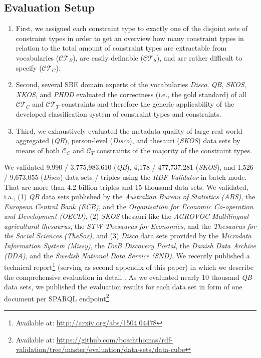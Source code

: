 \documentclass{llncs}
\begin{document}
{\subsection{Evaluation Setup}

\begin{enumerate}
	\item First, we assigned each constraint type to exactly one of the disjoint sets of constraint types 
in order to get an overview how many constraint types in relation to the total amount of constraint types are extractable from vocabularies ($\mathcal{CT}_{B}$), are easily definable ($\mathcal{CT}_{S}$), and are rather difficult to specify ($\mathcal{CT}_{C}$). 
  \item Second, several SBE domain experts of the vocabularies \emph{Disco}, \emph{QB}, \emph{SKOS}, \emph{XKOS}, and \emph{PHDD} evaluated the correctness (i.e., the gold standard) of all $\mathcal{CT}_{C}$ and $\mathcal{CT}_{T}$ constraints and therefore the generic applicability of the developed classification system of constraint types and constraints. 
  \item Third, we exhaustively evaluated the metadata quality of large real world aggregated (\emph{QB}), person-level (\emph{Disco}), and thesauri (\emph{SKOS}) data sets by means of both $\mathcal{C}_{C}$ and $\mathcal{C}_{T}$ constraints of the majority of the constraint types.
\end{enumerate}
We validated 
9,990 / 3,775,983,610 (\emph{QB}),
4,178 / 477,737,281 (\emph{SKOS}), and 
1,526 / 9,673,055 (\emph{Disco}) data sets / triples using the \emph{RDF Validator} in batch mode.
That are more than 4.2 billion triples and 15 thousand data sets.
We validated, i.a., 
(1) \emph{QB} data sets published by the \emph{Australian Bureau of Statistics (ABS)},
the \emph{European Central Bank (ECB)}, and the
\emph{Organisation for Economic Co-operation and Development (OECD)},
(2) \emph{SKOS} thesauri like the \emph{AGROVOC Multilingual agricultural thesaurus},
the \emph{STW Thesaurus for Economics}, and the
\emph{Thesaurus for the Social Sciences (TheSoz)}, and
(3) \emph{Disco} data sets provided by the \emph{Microdata Information System (Missy)}, 
the \emph{DwB Discovery Portal}, the
\emph{Danish Data Archive (DDA)}, and the
\emph{Swedish National Data Service (SND)}.
We recently published a technical report\footnote{\label{technical-report-2}Available at: \url{http://arxiv.org/abs/1504.04478}} (serving as second appendix of this paper) 
in which we describe the comprehensive evaluation in detail \cite{BoschZapilkoWackerowEckert2015-2}. 
As we evaluated nearly 10 thousand \emph{QB} data sets, we published the evaluation results for each data set in form of one document per SPARQL endpoint\footnote{Available at: \url{https://github.com/boschthomas/rdf-validation/tree/master/evaluation/data-sets/data-cube}}.

}
\end{document}
